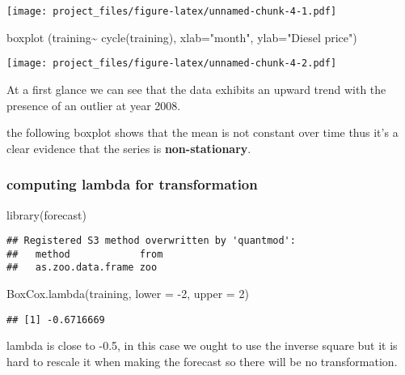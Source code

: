 \documentclass[
]{article}
\newenvironment{Shaded}{\begin{snugshade}}{\end{snugshade}}
\newcommand{\AttributeTok}[1]{\textcolor[rgb]{0.77,0.63,0.00}{#1}}
\newcommand{\DecValTok}[1]{\textcolor[rgb]{0.00,0.00,0.81}{#1}}
\newcommand{\FunctionTok}[1]{\textcolor[rgb]{0.00,0.00,0.00}{#1}}
\newcommand{\NormalTok}[1]{#1}
\newcommand{\SpecialCharTok}[1]{\textcolor[rgb]{0.00,0.00,0.00}{#1}}
\newcommand{\StringTok}[1]{\textcolor[rgb]{0.31,0.60,0.02}{#1}}
\begin{document}
\texttt{[image: project\_files/figure-latex/unnamed-chunk-4-1.pdf]}

\begin{Shaded}
\begin{Highlighting}[]
\FunctionTok{boxplot}\NormalTok{ (training}\SpecialCharTok{\textasciitilde{}} \FunctionTok{cycle}\NormalTok{(training), }\AttributeTok{xlab=}\StringTok{"month"}\NormalTok{, }\AttributeTok{ylab=}\StringTok{"Diesel price"}\NormalTok{)}
\end{Highlighting}
\end{Shaded}

\texttt{[image: project\_files/figure-latex/unnamed-chunk-4-2.pdf]}

At a first glance we can see that the data exhibits an upward trend with
the presence of an outlier at year 2008.

the following boxplot shows that the mean is not constant over time thus
it's a clear evidence that the series is \textbf{non-stationary}.

\hypertarget{computing-lambda-for-transformation}{%
\subsubsection{computing lambda for
transformation}\label{computing-lambda-for-transformation}}

\begin{Shaded}
\begin{Highlighting}[]
\FunctionTok{library}\NormalTok{(forecast)}
\end{Highlighting}
\end{Shaded}

\begin{verbatim}
## Registered S3 method overwritten by 'quantmod':
##   method            from
##   as.zoo.data.frame zoo
\end{verbatim}

\begin{Shaded}
\begin{Highlighting}[]
\FunctionTok{BoxCox.lambda}\NormalTok{(training,  }\AttributeTok{lower =} \SpecialCharTok{{-}}\DecValTok{2}\NormalTok{, }\AttributeTok{upper =} \DecValTok{2}\NormalTok{)}
\end{Highlighting}
\end{Shaded}

\begin{verbatim}
## [1] -0.6716669
\end{verbatim}

lambda is close to -0.5, in this case we ought to use the inverse square
but it is hard to rescale it when making the forecast so there will be
no transformation.
\end{document}
